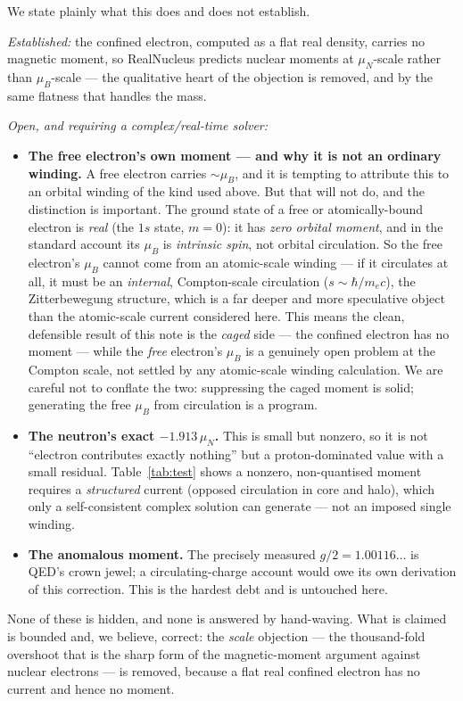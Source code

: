 \documentclass[11pt]{article}
\begin{document}
We state plainly what this does and does not establish.

\emph{Established:} the confined electron, computed as a flat real density, carries no magnetic moment, so
RealNucleus predicts nuclear moments at $\mu_N$-scale rather than $\mu_B$-scale --- the qualitative heart
of the objection is removed, and by the same flatness that handles the mass.

\emph{Open, and requiring a complex/real-time solver:}
\begin{itemize}
\item \textbf{The free electron's own moment --- and why it is not an ordinary winding.} A free electron
carries $\sim\mu_B$, and it is tempting to attribute this to an orbital winding of the kind used above.
But that will not do, and the distinction is important. The ground state of a free or atomically-bound
electron is \emph{real} (the $1s$ state, $m=0$): it has \emph{zero orbital moment}, and in the standard
account its $\mu_B$ is \emph{intrinsic spin}, not orbital circulation. So the free electron's $\mu_B$
cannot come from an atomic-scale winding --- if it circulates at all, it must be an \emph{internal},
Compton-scale circulation ($s\sim\hbar/m_ec$), the Zitterbewegung structure, which is a far deeper and
more speculative object than the atomic-scale current considered here. This means the clean, defensible
result of this note is the \emph{caged} side --- the confined electron has no moment --- while the
\emph{free} electron's $\mu_B$ is a genuinely open problem at the Compton scale, not settled by any
atomic-scale winding calculation. We are careful not to conflate the two: suppressing the caged moment is
solid; generating the free $\mu_B$ from circulation is a program.
\item \textbf{The neutron's exact $-1.913\,\mu_N$.} This is small but nonzero, so it is not ``electron
contributes exactly nothing'' but a proton-dominated value with a small residual. Table~\ref{tab:test}
shows a nonzero, non-quantised moment requires a \emph{structured} current (opposed circulation in core
and halo), which only a self-consistent complex solution can generate --- not an imposed single winding.
\item \textbf{The anomalous moment.} The precisely measured $g/2 = 1.00116\ldots$ is QED's crown jewel; a
circulating-charge account would owe its own derivation of this correction. This is the hardest debt and
is untouched here.
\end{itemize}

None of these is hidden, and none is answered by hand-waving. What is claimed is bounded and, we believe,
correct: the \emph{scale} objection --- the thousand-fold overshoot that is the sharp form of the
magnetic-moment argument against nuclear electrons --- is removed, because a flat real confined electron
has no current and hence no moment.
\end{document}
